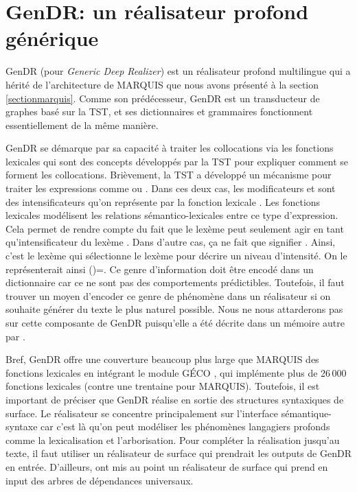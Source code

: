 
\chapter{GenDR: un réalisateur profond générique}\label{chapgendr}

GenDR (pour \emph{Generic Deep Realizer}) est un réalisateur profond multilingue \citep{lareau18} qui a hérité de l'architecture de MARQUIS \citep{WannerMARQUISGENERATIONUSERTAILORED2010} que nous avons présenté à la section \ref{sectionmarquis}. Comme son prédécesseur, GenDR est un transducteur de graphes basé sur la \ac{TST}, et ses dictionnaires et grammaires fonctionnent essentiellement de la même manière.

GenDR se démarque par sa capacité à traiter les collocations via les fonctions lexicales qui sont des concepts développés par la \ac{TST} pour expliquer comment se forment les collocations. Brièvement, la \ac{TST} a développé un mécanisme pour traiter les expressions comme  ou . Dans ces deux cas, les modificateurs  et  sont des intensificateurs qu'on représente par la fonction lexicale . Les fonctions lexicales modélisent les relations sémantico-lexicales entre ce type d'expression. Cela permet de rendre compte du fait que le lexème  peut seulement agir en tant qu'intensificateur du lexème . Dans d'autre cas, ça ne fait que signifier . Ainsi, c'est le lexème  qui sélectionne le lexème  pour décrire un niveau d'intensité. On le représenterait ainsi ()=. Ce genre d'information doit être encodé dans un dictionnaire car ce ne sont pas des comportements prédictibles. Toutefois, il faut trouver un moyen d'encoder ce genre de phénomène dans un réalisateur si on souhaite générer du texte le plus naturel possible. Nous ne nous attarderons pas sur cette composante de GenDR puisqu'elle a été décrite dans un mémoire autre par \cite{LambreyImplementationcollocationspour2017}. 

Bref, GenDR offre une couverture beaucoup plus large que MARQUIS des fonctions lexicales en intégrant le module GÉCO \citep{lambrey15,LambreyImplementationcollocationspour2017}, qui implémente plus de 26\,000 fonctions lexicales (contre une trentaine pour MARQUIS). Toutefois, il est important de préciser que GenDR réalise en sortie des structures syntaxiques de surface. Le réalisateur se concentre principalement sur l'interface sémantique-syntaxe car c'est là qu'on peut modéliser les phénomènes langagiers profonds comme la lexicalisation et l'arborisation. Pour compléter la réalisation jusqu'au texte, il faut utiliser un réalisateur de surface qui prendrait les outputs de GenDR en entrée. D'ailleurs, \cite{MilleSharedTaskProposal2017a} ont mis au point un réalisateur de surface qui prend en input des arbres de dépendances universaux.

